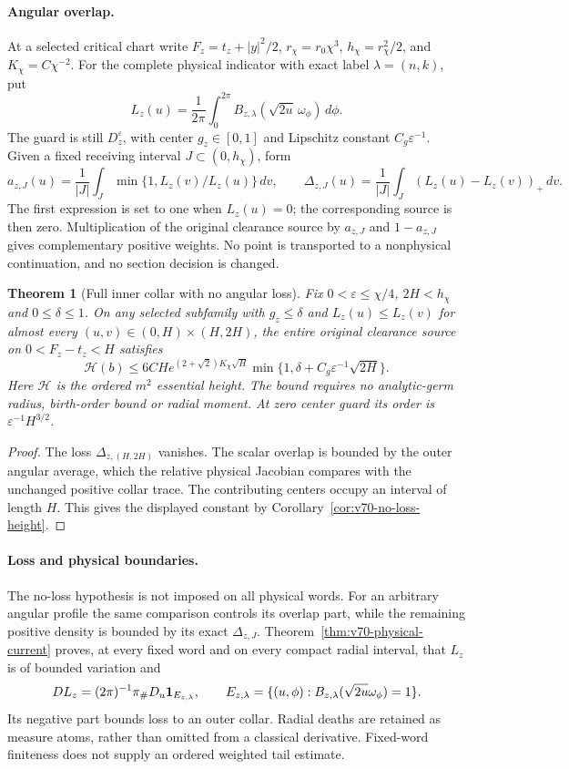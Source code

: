 \documentclass[11pt,reqno]{amsart}
\numberwithin{equation}{section}
\newtheorem{leadtheorem}{Theorem}
\theoremstyle{definition}\newtheorem{definition}[theorem]{Definition}
\theoremstyle{remark}\newtheorem{remark}[theorem]{Remark}
\begin{document}
\paragraph{Angular overlap.}
At a selected critical chart write $F_z=t_z+|y|^2/2$,
$r_\chi=r_0\chi^3$, $h_\chi=r_\chi^2/2$, and $K_\chi=C\chi^{-2}$.
For the complete physical indicator with exact label $\lambda=(n,k)$,
put
\[
 L_z(u)=\frac1{2\pi}\int_0^{2\pi}
                 B_{z,\lambda}(\sqrt{2u}\,\omega_\phi)\,d\phi.
\]
The guard is still $D_z^\varepsilon$, with center $g_z\in[0,1]$
and Lipschitz constant $C_g\varepsilon^{-1}$. Given a fixed receiving
interval $J\subset(0,h_\chi)$, form
\[
 a_{z,J}(u)=\frac1{|J|}\int_J\min\{1,L_z(v)/L_z(u)\}\,dv,
 \qquad
 \Delta_{z,J}(u)=\frac1{|J|}\int_J(L_z(u)-L_z(v))_+\,dv.
\]
The first expression is set to one when $L_z(u)=0$; the corresponding
source is then zero. Multiplication of the original clearance source
by $a_{z,J}$ and $1-a_{z,J}$ gives complementary positive weights.
No point is transported to a nonphysical continuation, and no section
decision is changed.

\newpage
\begin{leadtheorem}[Full inner collar with no angular loss]
\label{thm:intro-v70-no-loss}
Fix $0<\varepsilon\le\chi/4$, $2H<h_\chi$ and $0\le\delta\le1$.
On any selected subfamily with $g_z\le\delta$ and
$L_z(u)\le L_z(v)$ for almost every $(u,v)\in(0,H)\times(H,2H)$,
the entire original clearance source on $0<F_z-t_z<H$ satisfies
\[
 \mathcal H(b)\le6CH e^{(2+\sqrt2)K_\chi\sqrt H}
       \min\{1,\delta+C_g\varepsilon^{-1}\sqrt{2H}\}.
\]
Here $\mathcal H$ is the ordered $m^2$ essential height. The bound
requires no analytic-germ radius, birth-order bound or radial moment.
At zero center guard its order is $\varepsilon^{-1}H^{3/2}$.
\end{leadtheorem}
\begin{proof}
The loss $\Delta_{z,(H,2H)}$ vanishes. The scalar overlap is bounded
by the outer angular average, which the relative physical Jacobian
compares with the unchanged positive collar trace. The contributing
centers occupy an interval of length $H$. This gives the displayed
constant by Corollary~\ref{cor:v70-no-loss-height}.
\end{proof}

\paragraph{Loss and physical boundaries.}
The no-loss hypothesis is not imposed on all physical words. For an
arbitrary angular profile the same comparison controls its overlap
part, while the remaining positive density is bounded by its exact
$\Delta_{z,J}$. Theorem~\ref{thm:v70-physical-current} proves, at
every fixed word and on every compact radial interval, that $L_z$ is
of bounded variation and
\[
 DL_z=(2\pi)^{-1}\pi_\#D_u\mathbf1_{E_{z,\lambda}},
 \qquad E_{z,\lambda}=\{(u,\phi):B_{z,\lambda}(\sqrt{2u}\omega_\phi)=1\}.
\]
Its negative part bounds loss to an outer collar. Radial deaths are
retained as measure atoms, rather than omitted from a classical
derivative. Fixed-word finiteness does not supply an ordered weighted
tail estimate.
\end{document}
